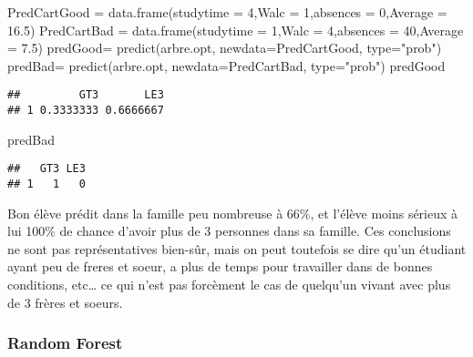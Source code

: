 \documentclass[
]{article}
\newenvironment{Shaded}{\begin{snugshade}}{\end{snugshade}}
\newcommand{\AttributeTok}[1]{\textcolor[rgb]{0.77,0.63,0.00}{#1}}
\newcommand{\DecValTok}[1]{\textcolor[rgb]{0.00,0.00,0.81}{#1}}
\newcommand{\FloatTok}[1]{\textcolor[rgb]{0.00,0.00,0.81}{#1}}
\newcommand{\FunctionTok}[1]{\textcolor[rgb]{0.00,0.00,0.00}{#1}}
\newcommand{\NormalTok}[1]{#1}
\newcommand{\OtherTok}[1]{\textcolor[rgb]{0.56,0.35,0.01}{#1}}
\newcommand{\StringTok}[1]{\textcolor[rgb]{0.31,0.60,0.02}{#1}}
\begin{document}
\begin{Shaded}
\begin{Highlighting}[]
\NormalTok{PredCartGood }\OtherTok{=} \FunctionTok{data.frame}\NormalTok{(}\AttributeTok{studytime =} \DecValTok{4}\NormalTok{,}\AttributeTok{Walc =} \DecValTok{1}\NormalTok{,}\AttributeTok{absences =} \DecValTok{0}\NormalTok{,}\AttributeTok{Average =} \FloatTok{16.5}\NormalTok{)}
\NormalTok{PredCartBad }\OtherTok{=} \FunctionTok{data.frame}\NormalTok{(}\AttributeTok{studytime =} \DecValTok{1}\NormalTok{,}\AttributeTok{Walc =} \DecValTok{4}\NormalTok{,}\AttributeTok{absences =} \DecValTok{40}\NormalTok{,}\AttributeTok{Average =} \FloatTok{7.5}\NormalTok{)}
\NormalTok{predGood}\OtherTok{=} \FunctionTok{predict}\NormalTok{(arbre.opt, }\AttributeTok{newdata=}\NormalTok{PredCartGood, }\AttributeTok{type=}\StringTok{"prob"}\NormalTok{)}
\NormalTok{predBad}\OtherTok{=} \FunctionTok{predict}\NormalTok{(arbre.opt, }\AttributeTok{newdata=}\NormalTok{PredCartBad, }\AttributeTok{type=}\StringTok{"prob"}\NormalTok{)}
\NormalTok{predGood}
\end{Highlighting}
\end{Shaded}

\begin{verbatim}
##         GT3       LE3
## 1 0.3333333 0.6666667
\end{verbatim}

\begin{Shaded}
\begin{Highlighting}[]
\NormalTok{predBad}
\end{Highlighting}
\end{Shaded}

\begin{verbatim}
##   GT3 LE3
## 1   1   0
\end{verbatim}

Bon élève prédit dans la famille peu nombreuse à 66\%, et l'élève moins
sérieux à lui 100\% de chance d'avoir plus de 3 personnes dans sa
famille. Ces conclusions ne sont pas représentatives bien-sûr, mais on
peut toutefois se dire qu'un étudiant ayant peu de freres et soeur, a
plus de temps pour travailler dans de bonnes conditions, etc\ldots{} ce
qui n'est pas forcèment le cas de quelqu'un vivant avec plus de 3 frères
et soeurs.

\hypertarget{random-forest}{%
\subsubsection{Random Forest}\label{random-forest}}
\end{document}
